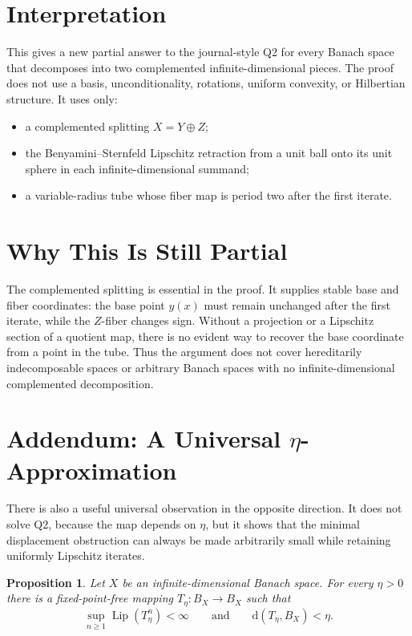 \documentclass[11pt]{article}
\newtheorem{proposition}{Proposition}
\newcommand{\Lip}{\operatorname{Lip}}
\begin{document}
\section*{Interpretation}

This gives a new partial answer to the journal-style Q2 for every Banach
space that decomposes into two complemented infinite-dimensional pieces.  The
proof does not use a basis, unconditionality, rotations, uniform convexity,
or Hilbertian structure.  It uses only:
\begin{itemize}
\item a complemented splitting \(X=Y\oplus Z\);
\item the Benyamini--Sternfeld Lipschitz retraction from a unit ball onto its
unit sphere in each infinite-dimensional summand;
\item a variable-radius tube whose fiber map is period two after the first
iterate.
\end{itemize}

\section*{Why This Is Still Partial}

The complemented splitting is essential in the proof.  It supplies stable
base and fiber coordinates: the base point \(y(x)\) must remain unchanged
after the first iterate, while the \(Z\)-fiber changes sign.  Without a
projection or a Lipschitz section of a quotient map, there is no evident way
to recover the base coordinate from a point in the tube.  Thus the argument
does not cover hereditarily indecomposable spaces or arbitrary Banach spaces
with no infinite-dimensional complemented decomposition.

\section*{Addendum: A Universal \(\eta\)-Approximation}

There is also a useful universal observation in the opposite direction.  It
does not solve Q2, because the map depends on \(\eta\), but it shows that the
minimal displacement obstruction can always be made arbitrarily small while
retaining uniformly Lipschitz iterates.

\begin{proposition}
Let \(X\) be an infinite-dimensional Banach space.  For every \(\eta>0\) there
is a fixed-point-free mapping \(T_\eta:B_X\to B_X\) such that
\[
\sup_{n\ge1}\Lip(T_\eta^n)<\infty
\qquad\text{and}\qquad
\mathrm d(T_\eta,B_X)<\eta .
\]
\end{proposition}
\end{document}
